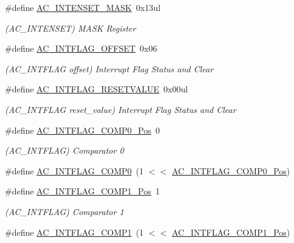 \begin{DoxyCompactItemize}
\item 
\#define \mbox{\hyperlink{group___s_a_m_d21___a_c_ga6eb6eed878938f2a3a5dc2b0bc7c1cb7}{A\+C\+\_\+\+I\+N\+T\+E\+N\+S\+E\+T\+\_\+\+M\+A\+SK}}~0x13ul
\begin{DoxyCompactList}\small\item\em (A\+C\+\_\+\+I\+N\+T\+E\+N\+S\+ET) M\+A\+SK Register \end{DoxyCompactList}\item 
\#define \mbox{\hyperlink{group___s_a_m_d21___a_c_gae663a8f3156ac7555b109208126e6d66}{A\+C\+\_\+\+I\+N\+T\+F\+L\+A\+G\+\_\+\+O\+F\+F\+S\+ET}}~0x06
\begin{DoxyCompactList}\small\item\em (A\+C\+\_\+\+I\+N\+T\+F\+L\+AG offset) Interrupt Flag Status and Clear \end{DoxyCompactList}\item 
\#define \mbox{\hyperlink{group___s_a_m_d21___a_c_gab2b31c52d59794ebe58100c5df360881}{A\+C\+\_\+\+I\+N\+T\+F\+L\+A\+G\+\_\+\+R\+E\+S\+E\+T\+V\+A\+L\+UE}}~0x00ul
\begin{DoxyCompactList}\small\item\em (A\+C\+\_\+\+I\+N\+T\+F\+L\+AG reset\+\_\+value) Interrupt Flag Status and Clear \end{DoxyCompactList}\item 
\#define \mbox{\hyperlink{group___s_a_m_d21___a_c_gabbdc400bbcac3a9c39d34452585974d1}{A\+C\+\_\+\+I\+N\+T\+F\+L\+A\+G\+\_\+\+C\+O\+M\+P0\+\_\+\+Pos}}~0
\begin{DoxyCompactList}\small\item\em (A\+C\+\_\+\+I\+N\+T\+F\+L\+AG) Comparator 0 \end{DoxyCompactList}\item 
\#define \mbox{\hyperlink{group___s_a_m_d21___a_c_gae8edc1d1541cc7e2e674ffc2d1c5b6c0}{A\+C\+\_\+\+I\+N\+T\+F\+L\+A\+G\+\_\+\+C\+O\+M\+P0}}~(1 $<$$<$ \mbox{\hyperlink{group___s_a_m_d21___a_c_gabbdc400bbcac3a9c39d34452585974d1}{A\+C\+\_\+\+I\+N\+T\+F\+L\+A\+G\+\_\+\+C\+O\+M\+P0\+\_\+\+Pos}})
\item 
\#define \mbox{\hyperlink{group___s_a_m_d21___a_c_gab160a35daee4074f1fd5921b02c00acb}{A\+C\+\_\+\+I\+N\+T\+F\+L\+A\+G\+\_\+\+C\+O\+M\+P1\+\_\+\+Pos}}~1
\begin{DoxyCompactList}\small\item\em (A\+C\+\_\+\+I\+N\+T\+F\+L\+AG) Comparator 1 \end{DoxyCompactList}\item 
\#define \mbox{\hyperlink{group___s_a_m_d21___a_c_ga4c7f6fa574a8eff7ac5587c2cb64cf67}{A\+C\+\_\+\+I\+N\+T\+F\+L\+A\+G\+\_\+\+C\+O\+M\+P1}}~(1 $<$$<$ \mbox{\hyperlink{group___s_a_m_d21___a_c_gab160a35daee4074f1fd5921b02c00acb}{A\+C\+\_\+\+I\+N\+T\+F\+L\+A\+G\+\_\+\+C\+O\+M\+P1\+\_\+\+Pos}})

\end{DoxyCompactItemize}

